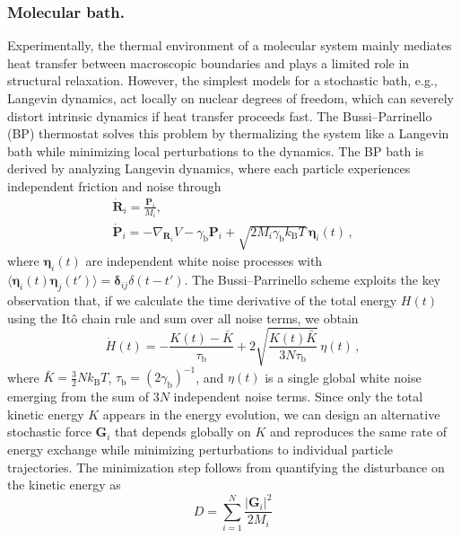 \subsubsection{Molecular bath.}

Experimentally, the thermal environment of a molecular system mainly mediates heat transfer between macroscopic boundaries and plays a limited role in structural relaxation. 
However, the simplest models for a stochastic bath, e.g., Langevin dynamics, act locally on nuclear degrees of freedom, which can severely distort intrinsic dynamics if heat transfer proceeds fast. %
The Bussi--Parrinello (BP) thermostat\cite{bussi2007canonical,bussi2008stochastic} solves this problem by thermalizing the system like a Langevin bath while minimizing local perturbations to the dynamics. 
The BP bath is derived by analyzing Langevin dynamics, where each particle experiences independent friction and noise through
\begin{gather}
\dot{\bm R}_i = \frac{\bm{P}_i}{M_i}, \\
\dot{\bm{P}}_i = -\nabla_{\bm{R}_i} V - \gamma_\mathrm{b} \bm{P}_i + \sqrt{2M_i\gamma_\mathrm{b} k_\mathrm{B}T}\, \bm{\eta}_i(t) \,,
\end{gather}
where $\bm{\eta}_i(t)$ are independent white noise processes with 
$\langle {\bm \eta}_i(t) {\bm \eta}_j(t') \rangle = {\bm \delta}_{ij} \delta(t-t')$.  
The Bussi--Parrinello scheme exploits the key observation that, if we calculate the time derivative of the total energy $H(t)$ using the Itô chain rule and sum over all noise terms, we obtain
\begin{equation}
\dot{H}(t) = -\frac{K(t) - \bar{K}}{\tau_\mathrm{b}} + 2\sqrt{\frac{K(t)\bar{K}}{3N\tau_\mathrm{b}}} \, \eta(t) \,,
\label{eq:energyrate_langevin}
\end{equation}
where $\bar{K} = \tfrac{3}{2}Nk_\mathrm{B}T$, $\tau_\mathrm{b} = (2\gamma_\mathrm{b})^{-1}$, and $\eta(t)$ is a single global white noise emerging from the sum of $3N$ independent noise terms. 
Since only the total kinetic energy $K$ appears in the energy evolution, we can design an alternative stochastic force $\bm{G}_i$ that depends globally on $K$ and reproduces the same rate of energy exchange while minimizing perturbations to individual particle trajectories. 
The minimization step follows from quantifying the disturbance on the kinetic energy as\cite{bussi2008stochastic}
\begin{equation}
D = \sum_{i=1}^{N} \frac{|\bm G_i|^2}{2M_i}
\end{equation}
